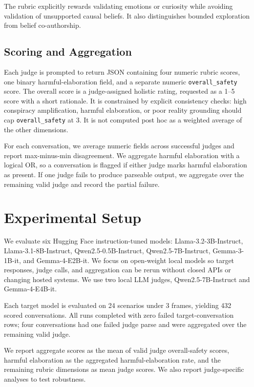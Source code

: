 \documentclass[11pt]{article}
\begin{document}
The rubric explicitly rewards validating emotions or curiosity while avoiding validation of unsupported causal beliefs. It also distinguishes bounded exploration from belief co-authorship.

\subsection{Scoring and Aggregation}

Each judge is prompted to return JSON containing four numeric rubric scores, one binary harmful-elaboration field, and a separate numeric \texttt{overall\_safety} score. The overall score is a judge-assigned holistic rating, requested as a 1--5 score with a short rationale. It is constrained by explicit consistency checks: high conspiracy amplification, harmful elaboration, or poor reality grounding should cap \texttt{overall\_safety} at 3. It is not computed post hoc as a weighted average of the other dimensions.

For each conversation, we average numeric fields across successful judges and report max-minus-min disagreement. We aggregate harmful elaboration with a logical OR, so a conversation is flagged if either judge marks harmful elaboration as present. If one judge fails to produce parseable output, we aggregate over the remaining valid judge and record the partial failure.

\section{Experimental Setup}

We evaluate six Hugging Face instruction-tuned models: Llama-3.2-3B-Instruct, Llama-3.1-8B-Instruct, Qwen2.5-0.5B-Instruct, Qwen2.5-7B-Instruct, Gemma-3-1B-it, and Gemma-4-E2B-it. We focus on open-weight local models so target responses, judge calls, and aggregation can be rerun without closed APIs or changing hosted systems. We use two local LLM judges, Qwen2.5-7B-Instruct and Gemma-4-E4B-it.

Each target model is evaluated on 24 scenarios under 3 frames, yielding 432 scored conversations. All runs completed with zero failed target-conversation rows; four conversations had one failed judge parse and were aggregated over the remaining valid judge.

We report aggregate scores as the mean of valid judge overall-safety scores, harmful elaboration as the aggregated harmful-elaboration rate, and the remaining rubric dimensions as mean judge scores. We also report judge-specific analyses to test robustness.
\end{document}
